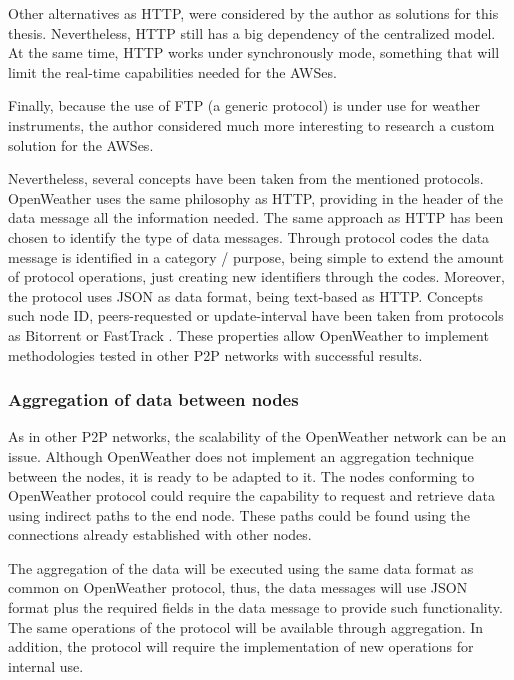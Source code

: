 Other alternatives as \gls{HTTP}, were considered by the author as solutions for this thesis. Nevertheless, \gls{HTTP} still has a big dependency of the centralized model. At the same time, \gls{HTTP} works under synchronously mode, something that will limit the real-time capabilities needed for the \gls{AWS}es.

Finally, because the use of \gls{FTP} (a generic protocol) is under use for weather instruments, the author considered much more interesting to research a custom solution for the \gls{AWS}es.

Nevertheless, several concepts have been taken from the mentioned protocols. OpenWeather uses the same philosophy as \gls{HTTP}, providing in the header of the data message all the information needed. The same approach as \gls{HTTP} has been chosen to identify the type of data messages. Through protocol codes the data message is identified in a category / purpose, being simple to extend the amount of protocol operations, just creating new identifiers through the codes. Moreover, the protocol uses \gls{JSON} as data format, being text-based as \gls{HTTP}. Concepts such node ID, peers-requested or update-interval have been taken from protocols as Bitorrent\cite{BITORRENT} or FastTrack\cite{FASTRACK} . These properties allow OpenWeather to implement methodologies tested in other \gls{P2P} networks with successful results.

\subsubsection{Aggregation of data between nodes}

As in other \gls{P2P} networks, the scalability of the OpenWeather network can be an issue. Although OpenWeather does not implement an aggregation technique between the nodes, it is ready to be adapted to it. The nodes conforming to OpenWeather protocol could require the capability to request and retrieve data using indirect paths to the end node. These paths could be found using the connections already established with other nodes.

The aggregation of the data will be executed using the same data format as common on OpenWeather protocol, thus, the data messages will use \gls{JSON} format plus the required fields in the data message to provide such functionality. The same operations of the protocol will be available through aggregation. In addition, the protocol will require the implementation of new operations for internal use.

